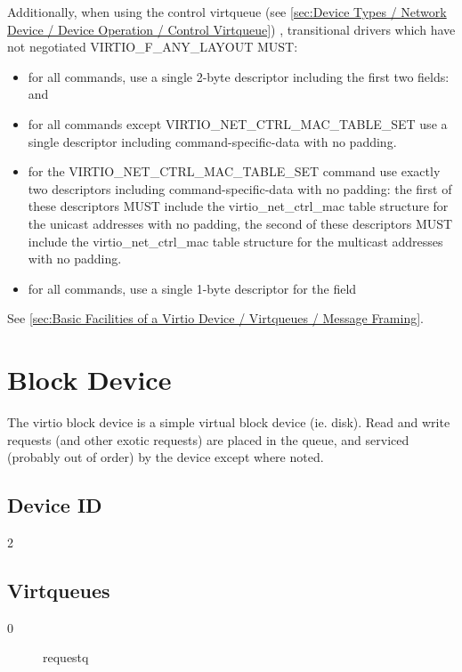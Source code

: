 Additionally, when using the control virtqueue (see \ref{sec:Device
Types / Network Device / Device Operation / Control Virtqueue})
, transitional drivers which have not
negotiated VIRTIO_F_ANY_LAYOUT MUST:
\begin{itemize}
\item for all commands, use a single 2-byte descriptor including the first two
fields:  and 
\item for all commands except VIRTIO_NET_CTRL_MAC_TABLE_SET
use a single descriptor including command-specific-data
with no padding.
\item for the VIRTIO_NET_CTRL_MAC_TABLE_SET command use exactly
two descriptors including command-specific-data with no padding:
the first of these descriptors MUST include the
virtio_net_ctrl_mac table structure for the unicast addresses with no padding,
the second of these descriptors MUST include the
virtio_net_ctrl_mac table structure for the multicast addresses
with no padding.
\item for all commands, use a single 1-byte descriptor for the
 field
\end{itemize}

See \ref{sec:Basic
Facilities of a Virtio Device / Virtqueues / Message Framing}.

\section{Block Device}\label{sec:Device Types / Block Device}

The virtio block device is a simple virtual block device (ie.
disk). Read and write requests (and other exotic requests) are
placed in the queue, and serviced (probably out of order) by the
device except where noted.

\subsection{Device ID}\label{sec:Device Types / Block Device / Device ID}
  2

\subsection{Virtqueues}\label{sec:Device Types / Block Device / Virtqueues}
\begin{description}
\item[0] requestq
\end{description}

